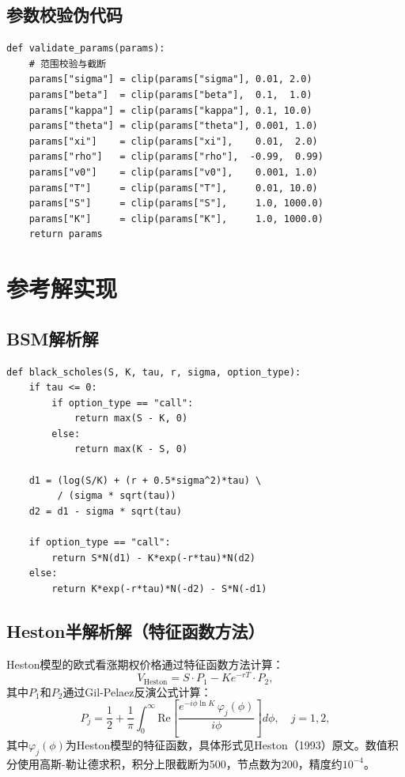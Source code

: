 \subsection{参数校验伪代码}

\begin{verbatim}
def validate_params(params):
    # 范围校验与截断
    params["sigma"] = clip(params["sigma"], 0.01, 2.0)
    params["beta"]  = clip(params["beta"],  0.1,  1.0)
    params["kappa"] = clip(params["kappa"], 0.1, 10.0)
    params["theta"] = clip(params["theta"], 0.001, 1.0)
    params["xi"]    = clip(params["xi"],    0.01,  2.0)
    params["rho"]   = clip(params["rho"],  -0.99,  0.99)
    params["v0"]    = clip(params["v0"],    0.001, 1.0)
    params["T"]     = clip(params["T"],     0.01, 10.0)
    params["S"]     = clip(params["S"],     1.0, 1000.0)
    params["K"]     = clip(params["K"],     1.0, 1000.0)
    return params
\end{verbatim}

\section{参考解实现}

\subsection{BSM解析解}

\begin{verbatim}
def black_scholes(S, K, tau, r, sigma, option_type):
    if tau <= 0:
        if option_type == "call":
            return max(S - K, 0)
        else:
            return max(K - S, 0)

    d1 = (log(S/K) + (r + 0.5*sigma^2)*tau) \
         / (sigma * sqrt(tau))
    d2 = d1 - sigma * sqrt(tau)

    if option_type == "call":
        return S*N(d1) - K*exp(-r*tau)*N(d2)
    else:
        return K*exp(-r*tau)*N(-d2) - S*N(-d1)
\end{verbatim}

\subsection{Heston半解析解（特征函数方法）}

Heston模型的欧式看涨期权价格通过特征函数方法计算：
\begin{equation}
  V_\text{Heston} = S\cdot P_1 - Ke^{-rT}\cdot P_2,
\end{equation}
其中$P_1$和$P_2$通过Gil-Pelaez反演公式计算：
\begin{equation}
  P_j = \frac{1}{2} + \frac{1}{\pi}\int_0^\infty
    \text{Re}\!\left[\frac{e^{-i\phi\ln K}\,\varphi_j(\phi)}{i\phi}\right]d\phi,
    \quad j=1,2,
\end{equation}
其中$\varphi_j(\phi)$为Heston模型的特征函数，具体形式见Heston（1993）原文。数值积分使用高斯-勒让德求积，积分上限截断为500，节点数为200，精度约$10^{-4}$。

